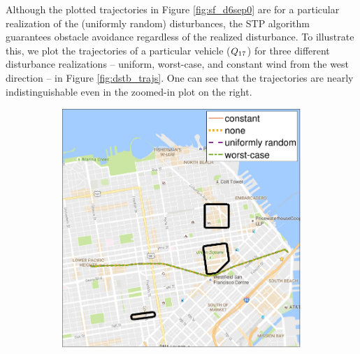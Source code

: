 Although the plotted trajectories in Figure \ref{fig:sf_d6sep0} are for a particular realization of the (uniformly random) disturbances, the STP algorithm guarantees obstacle avoidance regardless of the realized disturbance. To illustrate this, we plot the trajectories of a particular vehicle ($Q_{17}$) for three different disturbance realizations -- uniform, worst-case, and constant wind from the west direction -- in Figure \ref{fig:dstb_trajs}. One can see that the trajectories are nearly indistinguishable even in the zoomed-in plot on the right. 

\begin{figure}[!htb]
  \centering
  \begin{subfigure}{0.5\textwidth}
    \includegraphics[width=\columnwidth]{figs/dstb_trajs}
    \subcaption{}
    \label{fig:dstb_trajs_s1}
  \end{subfigure}%
  \begin{subfigure}{0.5\textwidth}

\end{subfigure}
\end{figure}
